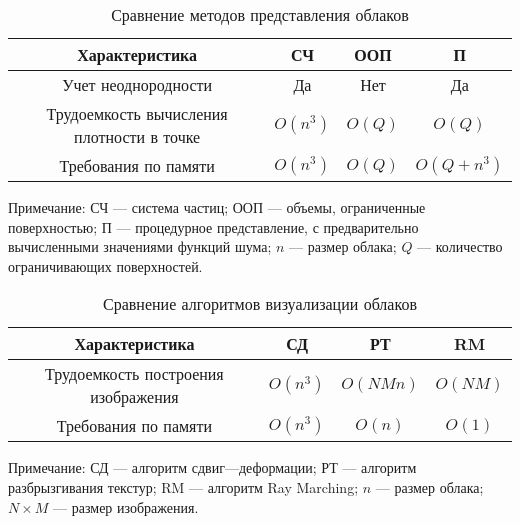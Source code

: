 \begin{table}[H]
	\begin{center}
		\begin{threeparttable}
			\captionsetup{justification=raggedright,singlelinecheck=off}
			\caption{Сравнение методов представления облаков}
			\label{tbl:repr_choice}
			\begin{tabular}{|c|c|c|c|}
				\hline
				Характеристика &  СЧ  & ООП & П \\
				\hline
				Учет неоднородности &  Да  & Нет & Да \\
				\hline
				Трудоемкость вычисления плотности в точке &  $O(n^3)$ & $O(Q)$ & $O(Q)$ \\
				\hline
				Требования по памяти &  $O(n^3)$ & $O(Q)$ & $O(Q + n^3)$ \\
				\hline
			\end{tabular}
			\begin{tablenotes}
				\small
				\item Примечание: СЧ --- система частиц; ООП --- объемы, ограниченные поверхностью; П --- процедурное представление, с предварительно вычисленными значениями функций шума; $n$ --- размер облака; $Q$ --- количество ограничивающих поверхностей.
			\end{tablenotes}
		\end{threeparttable}
	\end{center}
\end{table}

\begin{table}[H]
	\begin{center}
		\begin{threeparttable}
			\captionsetup{justification=raggedright,singlelinecheck=off}
			\caption{Сравнение алгоритмов визуализации облаков}
			\label{tbl:rend_choice}
			\begin{tabular}{|c|c|c|c|}
				\hline
				Характеристика &  СД  & РТ & RM \\
				\hline
				Трудоемкость построения изображения &  $O(n^3)$  & $O(NMn)$ & $O(NM)$ \\
				\hline
				Требования по памяти & $O(n^3)$ & $O(n)$ & $O(1)$ \\
				\hline
			\end{tabular}
			\begin{tablenotes}
				\small
				\item Примечание:  СД --- алгоритм сдвиг---деформации; РТ --- алгоритм разбрызгивания текстур; RM --- алгоритм Ray Marching; $n$ --- размер облака; $N \times M$ --- размер изображения.
			\end{tablenotes}
		\end{threeparttable}
	\end{center}
\end{table}



